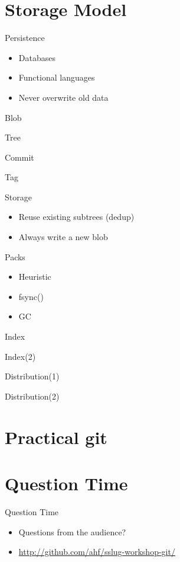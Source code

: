 \documentclass[xcolor=pdftex,dvipsnames]{beamer}
\begin{document}
\section{Storage Model}
\begin{frame}{Persistence}
  \begin{itemize}
  \item Databases
  \item Functional languages
  \item Never overwrite old data
  \end{itemize}
\end{frame}
\begin{frame}{Blob}\end{frame}
\begin{frame}{Tree}\end{frame}
\begin{frame}{Commit}\end{frame}
\begin{frame}{Tag}\end{frame}
\begin{frame}{Storage}
  \begin{itemize}
  \item Reuse existing subtrees (dedup)
  \item Always write a new blob
  \end{itemize}
\end{frame}
\begin{frame}{Packs}
  \begin{itemize}
  \item Heuristic
  \item fsync()
  \item GC
  \end{itemize}
\end{frame}
\begin{frame}{Index}\end{frame}
\begin{frame}{Index(2)}\end{frame}
\begin{frame}{Distribution(1)}\end{frame}
\begin{frame}{Distribution(2)}\end{frame}

\section{Practical git}

\section{Question Time}
\begin{frame}{Question Time}
    \begin{itemize}
        \item Questions from the audience?
        \item \url{http://github.com/ahf/sslug-workshop-git/}
    \end{itemize}
\end{frame}
\end{document}
